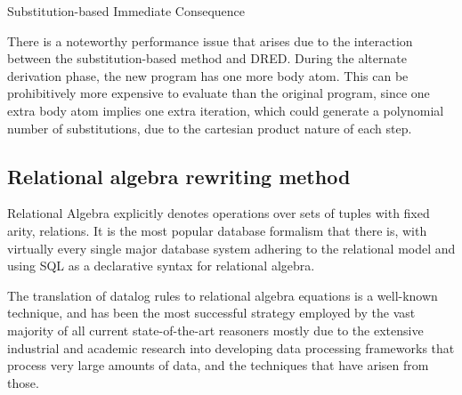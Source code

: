 \documentclass[sigconf,screen,review,natbib]{acmart}
\theoremstyle{definition}
\begin{document}
\begin{algorithm}
	\SetAlgoLined
	\caption{Substitution-based Immediate Consequence}
\end{algorithm}
There is a noteworthy performance issue that arises due to the interaction between the substitution-based method
and DRED. During the alternate derivation phase, the new program has one more body atom. This can be prohibitively
more expensive to evaluate than the original program, since one extra body atom implies one extra iteration, which
could generate a polynomial number of substitutions, due to the cartesian product nature of each step.

\subsection{Relational algebra rewriting method}
Relational Algebra\cite{codd_1970} explicitly denotes operations over sets of tuples with fixed
arity, relations. It is the most popular database formalism that there is, with virtually every single
major database system adhering to the relational model\cite{pg,mysql,sqlserver} and using SQL as a
declarative syntax for relational algebra.

The translation of datalog rules to relational algebra equations is a well-known technique, and has been
the most successful strategy employed by the vast majority of all current state-of-the-art reasoners\cite{bigdatalog, cog, nexus, recstep, dcdatalog, souffle}
mostly due to the extensive industrial and academic research into developing data processing frameworks
that process very large amounts of data, and the techniques that have arisen from those.
\end{document}
